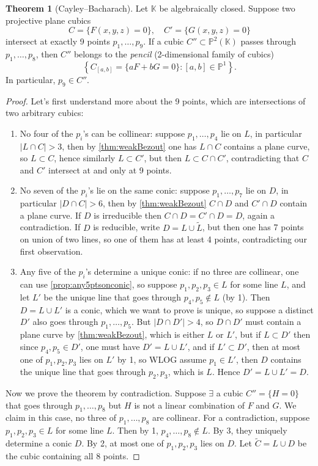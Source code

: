 \documentclass{article}
\newcommand{\K}{\mathbb{K}}
\newcommand{\p}{\mathbb{P}}
\theoremstyle{definition}
\newtheorem{thm}[defn]{Theorem}
\begin{document}
\begin{thm}[Cayley--Bacharach]
Let $\K$ be algebraically closed. Suppose two projective plane cubics
\[
C=\{F(x,y,z)=0\},\quad C'=\{G(x,y,z)=0\}
\]
intersect at exactly 9 points $p_1,\ldots,p_9$. If a cubic $C''\subset\p^2(\K)$ passes through $p_1,\ldots,p_8$, then $C''$ belongs to the \textit{pencil} (2-dimensional family of cubics)
\[
\left\{C_{[a,b]}=\{aF+bG=0\}:[a,b]\in\p^1\right\}.
\]
In particular, $p_9\in C''$.
\end{thm}
\begin{proof}
Let's first understand more about the 9 points, which are intersections of two arbitrary cubics:
\begin{enumerate}
\item No four of the $p_i$'s can be collinear: suppose $p_1,\ldots,p_4$ lie on $L$, in particular $|L\cap C|>3$, then by \ref{thm:weakBezout} one has $L\cap C$ contains a plane curve, so $L\subset C$, hence similarly $L\subset C'$, but then $L\subset C\cap C'$, contradicting that $C$ and $C'$ intersect at and only at 9 points.
\item No seven of the $p_i$'s lie on the same conic: suppose $p_1,\ldots,p_7$ lie on $D$, in particular $|D\cap C|>6$, then by \ref{thm:weakBezout} $C\cap D$ and $C'\cap D$ contain a plane curve. If $D$ is irreducible then $C\cap D=C'\cap D=D$, again a contradiction. If $D$ is reducible, write $D=L\cup\widetilde L$, but then one has 7 points on union of two lines, so one of them has at least 4 points, contradicting our first observation.
\item Any five of the $p_i$'s determine a unique conic: if no three are collinear, one can use \ref{prop:any5ptsonconic}, so suppose $p_1,p_2,p_3\in L$ for some line $L$, and let $L'$ be the unique line that goes through $p_4,p_5\notin L$ (by 1). Then $D=L\cup L'$ is a conic, which we want to prove is unique, so suppose a distinct $D'$ also goes through $p_1,\ldots,p_5$. But $|D\cap D'|>4$, so $D\cap D'$ must contain a plane curve by \ref{thm:weakBezout}, which is either $L$ or $L'$, but if $L\subset D'$ then since $p_4,p_5\in D'$, one must have $D'=L\cup L'$, and if $L'\subset D'$, then at most one of $p_1,p_2,p_3$ lies on $L'$ by 1, so WLOG assume $p_1\in L'$, then $D$ contains the unique line that goes through $p_2,p_3$, which is $L$. Hence $D'=L\cup L'=D$.
\end{enumerate}
Now we prove the theorem by contradiction. Suppose $\exists$ a cubic $C''=\{H=0\}$ that goes through $p_1,\ldots,p_8$ but $H$ is not a linear combination of $F$ and $G$. We claim in this case, no three of $p_1,\ldots,p_8$ are collinear. For a contradiction, suppose $p_1,p_2,p_3\in L$ for some line $L$. Then by 1, $p_4,\ldots,p_8\notin L$. By 3, they uniquely determine a conic $D$. By 2, at most one of $p_1,p_2,p_3$ lies on $D$. Let $\widetilde C=L\cup D$ be the cubic containing all 8 points.


\end{proof}
\end{document}
